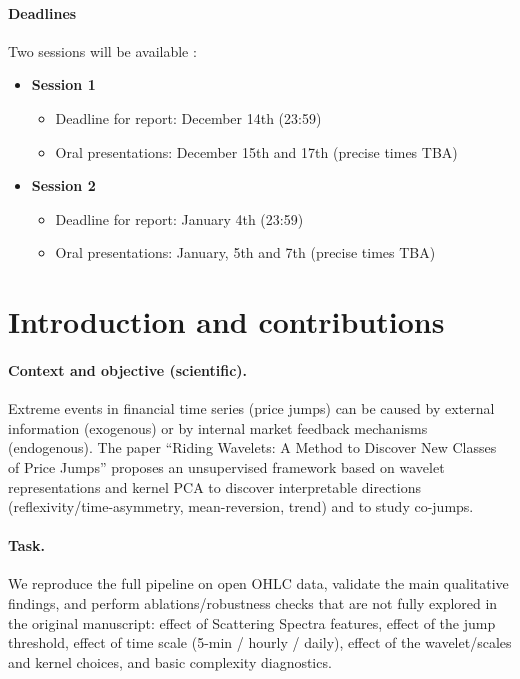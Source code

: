 \documentclass[11pt]{article}
\begin{document}
\paragraph{Deadlines}
Two sessions will be available :
\begin{itemize}
 \item \textbf{Session 1}
 \begin{itemize}
  \item Deadline for report: December 14th (23:59)
  \item Oral presentations: December 15th and 17th (precise times TBA)
 \end{itemize}
\item \textbf{Session 2}
 \begin{itemize}
  \item Deadline for report: January 4th (23:59)
  \item Oral presentations: January, 5th and 7th (precise times TBA)
 \end{itemize}
\end{itemize}

\section{Introduction and contributions}

\paragraph{Context and objective (scientific).}
Extreme events in financial time series (price jumps) can be caused by external information (exogenous) or by internal market feedback mechanisms (endogenous). The paper ``Riding Wavelets: A Method to Discover New Classes of Price Jumps'' proposes an unsupervised framework based on wavelet representations and kernel PCA to discover interpretable directions (reflexivity/time-asymmetry, mean-reversion, trend) and to study co-jumps.

\paragraph{Task.}
We reproduce the full pipeline on open OHLC data, validate the main qualitative findings, and perform ablations/robustness checks that are not fully explored in the original manuscript: effect of Scattering Spectra features, effect of the jump threshold, effect of time scale (5-min / hourly / daily), effect of the wavelet/scales and kernel choices, and basic complexity diagnostics.
\end{document}
